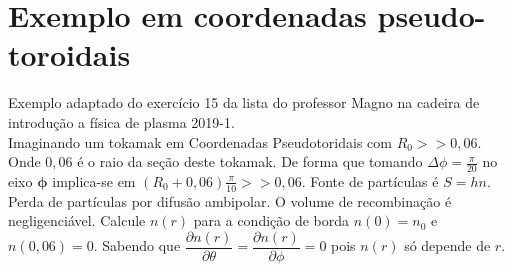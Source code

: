 \documentclass[12pt,oneside,a4paper]{abntex2}
\begin{document}
\section{Exemplo em coordenadas pseudo-toroidais}
\noindent Exemplo adaptado do exercício 15 da lista do professor Magno na cadeira de introdução a física de plasma 2019-1.\\
Imaginando um tokamak em Coordenadas Pseudotoridais com $R_0 >>0,06$. Onde $0,06$ é o raio da seção deste tokamak. De forma que tomando $\Delta \phi=\frac{\pi}{20}$ no eixo $\bm{\phi}$ implica-se em $(R_0+0,06)\frac{\pi}{10} >> 0,06$. Fonte de partículas é $S=hn$. Perda de partículas por difusão ambipolar. O volume de recombinação é negligenciável. Calcule $n(r)$ para a condição de borda $n(0)=n_0$ e $n(0,06)=0$. Sabendo que $\dfrac{\partial n(r)}{\partial \theta} = \dfrac{\partial n(r)}{\partial \phi}=0$ pois $n(r)$ só depende de $r$.
\end{document}
